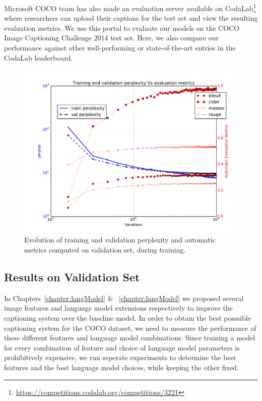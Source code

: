 Microsoft COCO team has also made an evaluation server available on
CodaLab\footnote{\url{https://competitions.codalab.org/competitions/3221}} where
researchers can upload their captions for the test set and view the resulting
evaluation metrics.
We use this portal to evaluate our models on the COCO Image Captioning Challenge
2014 test set. 
Here, we also compare our performance against other well-performing or
state-of-the-art entries in the CodaLab leaderboard.
\begin{figure}[ht]
\begin{center}
  \includegraphics[width=0.7\linewidth]{images/MetVsPerplex.pdf}
\end{center}
\vspace*{-10mm}
\caption{Evolution of training and validation perplexity and automatic metrics
        computed on validation set, during training.}
\label{fig:MetVsPerplex}
\end{figure}

\subsection{Results on Validation Set}
In Chapters~\ref{chapter:langModel} \& ~\ref{chapter:langModel} we proposed
several image features and language model extensions respectively to improve the
captioning system over the baseline model.
In order to obtain the best posssible captioning system for the COCO dataset, we
need to measure the performance of these different features and language model
combinations.
Since training a model for every combination of feature and choice of language
model parameters is prohibitively expensive, we run seperate experiments to
determine the best features and the best language model choices, while keeping
the other fixed.
